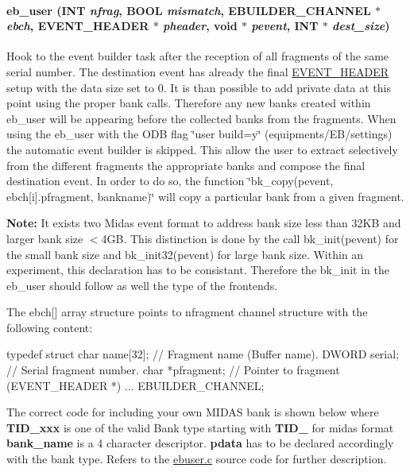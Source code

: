 \paragraph[{eb\_\-user}]{ eb\_\-user ({\bf INT} {\em nfrag}, \/  {\bf BOOL} {\em mismatch}, \/  EBUILDER\_\-CHANNEL $\ast$ {\em ebch}, \/  {\bf EVENT\_\-HEADER} $\ast$ {\em pheader}, \/  void $\ast$ {\em pevent}, \/  {\bf INT} $\ast$ {\em dest\_\-size})}\hfill\label{ebuser_8c_a1ed2952fe1f5feb08e6dddc94a26288b}
Hook to the event builder task after the reception of all fragments of the same serial number. The destination event has already the final \hyperlink{structEVENT__HEADER}{EVENT\_\-HEADER} setup with the data size set to 0. It is than possible to add private data at this point using the proper bank calls. Therefore any new banks created within eb\_\-user will be appearing before the collected banks from the fragments. When using the eb\_\-user with the ODB flag \char`\"{}user build=y\char`\"{} (equipments/EB/settings) the automatic event builder is skipped. This allow the user to extract selectively from the different fragments the appropriate banks and compose the final destination event. In order to do so, the function \char`\"{}bk\_\-copy(pevent, ebch\mbox{[}i\mbox{]}.pfragment, bankname)\char`\"{} will copy a particular bank from a given fragment.

{\bfseries Note:} It exists two Midas event format to address bank size less than 32KB and larger bank size $<$4GB. This distinction is done by the call bk\_\-init(pevent) for the small bank size and bk\_\-init32(pevent) for large bank size. Within an experiment, this declaration has to be consistant. Therefore the bk\_\-init in the eb\_\-user should follow as well the type of the frontends.

The ebch\mbox{[}\mbox{]} array structure points to nfragment channel structure with the following content: 
\begin{DoxyCode}
typedef struct {
    char  name[32];         // Fragment name (Buffer name).
    DWORD serial;           // Serial fragment number.
    char *pfragment;        // Pointer to fragment (EVENT_HEADER *)
    ...
} EBUILDER_CHANNEL;
\end{DoxyCode}


The correct code for including your own MIDAS bank is shown below where {\bfseries TID\_\-xxx} is one of the valid Bank type starting with {\bfseries TID\_\-} for midas format {\bfseries bank\_\-name} is a 4 character descriptor. {\bfseries pdata} has to be declared accordingly with the bank type. Refers to the \hyperlink{ebuser_8c}{ebuser.c} source code for further description.

